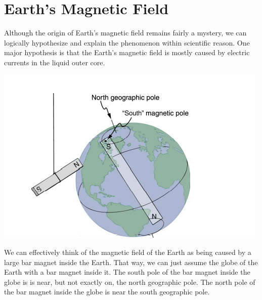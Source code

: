 \documentclass[9pt]{article}
\begin{document}
	\section*{Earth's Magnetic Field}
	Although the origin of Earth's magnetic field remains fairly a mystery, we can logically hypothesize and explain the phenomenon within scientific reason. One major hypothesis is that the Earth's magnetic field is mostly caused by electric currents in the liquid outer core. 
	\begin{center}
		\includegraphics[scale=0.2]{earth_magnetic_field}
	\end{center}
	We can effectively think of the magnetic field of the Earth as being caused by a large bar magnet inside the Earth. That way, we can just assume the globe of the Earth with a bar magnet inside it. The south pole of the bar magnet inside the globe is is near, but not exactly on, the north geographic pole. The north pole of the bar magnet inside the globe is near the south geographic pole. \\ \\
\end{document}

